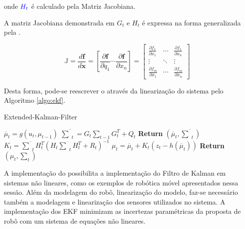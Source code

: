 \noindent onde $\color{blue}H_t$ é calculado pela Matriz Jacobiana.

A matriz Jacobiana demonstrada em $G_t$ e $H_t$ é expressa na forma generalizada pela .

\begin{equation}
    \label{eq:taylor5}
    \mathbb{J}
    =
    \frac{d \mathbf{f}}{d \mathbf{x}}
    =
    \left[ \frac{\partial \mathbf{f}}{\partial q_1}
        \cdots \frac{\partial \mathbf{f}}{\partial x_n} \right]
    =
    \begin{bmatrix}
        \frac{\partial f_1}{\partial x_1} & \cdots &
        \frac{\partial f_1}{\partial x_n}                   \\
        \vdots                            & \ddots & \vdots \\
        \frac{\partial f_m}{\partial x_1} & \cdots &
        \frac{\partial f_m}{\partial x_n}
    \end{bmatrix}
\end{equation}

Desta forma, pode-se reescrever o  através da linearização do sistema pelo Algoritmo \ref{algo:ekf}.

\begin{algorithm}[H]
    \caption{Extended-Kalman-Filter}
    \begin{algorithmic}[1]
        \State $\overline{\mu}_t = g(u_t, \mu_{t-1})$
        \State $ \overline{\textstyle\sum}_t = G_t {\textstyle\sum}_{t-1} G_t^T+ Q_t$ 
        \State \textbf{Return} $\left(\overline{\mu}_t, \overline{\textstyle\sum}_t\right)$
    \EndProcedure
        \State $K_t = \overline{\textstyle\sum}_tH_t^T(H_t\overline{\textstyle\sum}_tH_t^T+R_t)^{-1}$
        \State $\mu_t  = \overline{\mu}_t + K_t(z_t -h(\overline\mu_t))$
        \State \textbf{Return} $\left(\mu_t, \textstyle\sum_t\right)$
    \EndProcedure
    \end{algorithmic}
    \label{algo:ekf}
\end{algorithm}

A implementação do  possibilita a implementação do Filtro de Kalman em sistemas não lineares, como os exemplos de robótica móvel apresentados nessa sessão. Além da modelagem do robô, linearização do modelo, faz-se necessário também a modelagem e linearização dos sensores utilizados no sistema. A implementação dos EKF minimizam as incertezas paramétricas da proposta de robô com um sistema de equações não lineares.